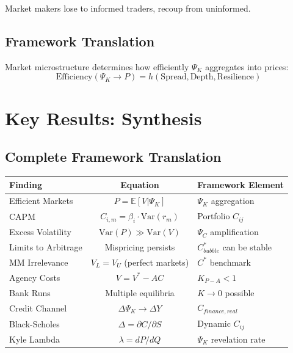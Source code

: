 Market makers lose to informed traders, recoup from uninformed.

\subsection{Framework Translation}

Market microstructure determines how efficiently $\Psi_K$ aggregates into prices:
\begin{equation}
\text{Efficiency}(\Psi_K \to P) = h(\text{Spread}, \text{Depth}, \text{Resilience})
\end{equation}


\section{Key Results: Synthesis}
\label{sec:Y-results}

\subsection{Complete Framework Translation}

\begin{center}
\renewcommand{\arraystretch}{1.5}
\begin{tabular}{|l|c|l|}
\hline
\textbf{Finding} & \textbf{Equation} & \textbf{Framework Element} \\
\hline
Efficient Markets & $P = \mathbb{E}[V | \Psi_K]$ & $\Psi_K$ aggregation \\
\hline
CAPM & $C_{i,m} = \beta_i \cdot \text{Var}(r_m)$ & Portfolio $C_{ij}$ \\
\hline
Excess Volatility & $\text{Var}(P) \gg \text{Var}(V)$ & $\Psi_C$ amplification \\
\hline
Limits to Arbitrage & Mispricing persists & $C^*_{bubble}$ can be stable \\
\hline
MM Irrelevance & $V_L = V_U$ (perfect markets) & $C^*$ benchmark \\
\hline
Agency Costs & $V = V^* - AC$ & $K_{P-A} < 1$ \\
\hline
Bank Runs & Multiple equilibria & $K \to 0$ possible \\
\hline
Credit Channel & $\Delta \Psi_K \to \Delta Y$ & $C_{finance, real}$ \\
\hline
Black-Scholes & $\Delta = \partial C / \partial S$ & Dynamic $C_{ij}$ \\
\hline
Kyle Lambda & $\lambda = dP/dQ$ & $\Psi_K$ revelation rate \\
\hline
\end{tabular}
\end{center}

